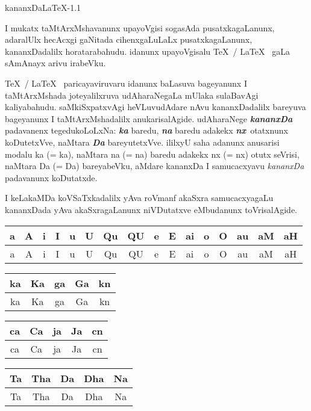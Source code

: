 \documentclass[12pt]{article}
\begin{document}
\centerline{\Huge kananxDa{\huge\rm\LaTeX}-1.1 } 
\medskip

I mukatx taMtArxMshavanunx upayoVgisi sogasAda pusatxkagaLanunx, adaralUlx
hecAcxgi gaNitada cihenxgaLuLaLx pusatxka\-gaLanunx, kananxDadalilx
horatarabahudu. idanunx upayoVgisalu {\rm \TeX\ / \LaTeX\ } gaLa sAmAnayx arivu
irabeVku.

\medskip
{\rm\TeX\ / \LaTeX\ } paricayaviruvaru idanunx baLasuva bageyanunx I
taMtArxMshada joteyalilxruva udAharaNegaLa mUlaka sulaBavAgi kaliyabahudu. 
saMkiSxpatxvAgi
heVLuvudAdare nAvu kananxDadalilx bareyuva bageyanunx I taMtArxMshadalilx
anukarisalAgide. udAharaNege {\sl\bfseries kananxDa} padavanenx tegedukoLoLxNa:
{\sl\bfseries ka} baredu, {\sl\bfseries na} baredu adakekx \kern3pt\hbox{\sl\bfseries nx}~otatxnunx koDutetxVve,
naMtara {\sl\bfseries Da} bareyutetxVve.
ililxyU saha adanunx anusarisi modalu {\rm ka} (= ka), naMtara {\rm na} (= na)
baredu adakekx {\rm nx} (= \kern3pt\hbox{nx}) otutx seVrisi, naMtara {\rm Da} (= Da)
bareyabeVku, aMdare {\rm kananxDa} I samucacxyavu {\sl kananxDa} padavanunx
koDutatxde.

I keLakaMDa koVSaTxkadalilx yAva roVmanf akaSxra samucacxyagaLu kananxDada
yAva akaSxragaLanunx niVDutatxve eMbudanunx toVrisalAgide. 

\smallskip
\begin{tabular}{|c|c|c|c|c|c|c|c|c|c|c|c|c|c|c|c|}
\hline
{\rm a} & {\rm A} & {\rm i} & {\rm I} & {\rm u} & {\rm U} & {\rm Qu} & {\rm
QU} & {\rm e} & {\rm E} & {\rm ai} & {\rm o} & {\rm O} & {\rm au} & {\rm aM}
& {\rm aH} \\ 
\hline
a & A & i & I & u & U & Qu & QU & e & E & ai & o & O & au & aM & aH \\
\hline
\end{tabular}

\bigskip
\begin{tabular}{|c|c|c|c|c|}
\hline
{\rm ka} & {\rm Ka} & {\rm ga} &  {\rm Ga} & {\rm kn}\\ 
\hline
ka & Ka & ga & Ga & kn\\
\hline
\end{tabular}

\bigskip
\begin{tabular}{|c|c|c|c|c|}
\hline
{\rm ca} & {\rm Ca} & {\rm ja} &  {\rm Ja} & {\rm cn}\\ 
\hline
ca & Ca & ja & Ja & cn\\
\hline
\end{tabular}

\bigskip
\begin{tabular}{|c|c|c|c|c|}
\hline
{\rm Ta} & {\rm Tha} & {\rm Da} &  {\rm Dha} & {\rm Na}\\ 
\hline
Ta & Tha & Da & Dha & Na\\
\hline
\end{tabular}
\end{document}
